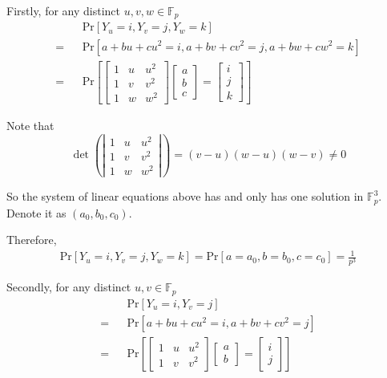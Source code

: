 		\item
		
			Firstly, for any distinct $u, v, w \in \mathbb{F}_{p}$
			\begin{eqnarray*}
				&&\text{Pr}[Y_u = i, Y_v = j, Y_w = k] \\
				= &&\text{Pr}[a + bu + cu^2 = i, a + bv + cv^2 = j, a + bw + cw^2 = k] \\
				= &&\text{Pr}[
				\left[
				\begin{matrix}
					1 & u & u^2 \\
					1 & v & v^2 \\
					1 & w & w^2
				\end{matrix}
				\right]
				\left[
				\begin{matrix}
					a \\
					b \\
					c
				\end{matrix}
				\right]
				=
				\left[
				\begin{matrix}
					i \\
					j \\
					k
				\end{matrix}
				\right]
				]
			\end{eqnarray*}
			
			Note that
			\[
				\det
				\left(\left|
				\begin{matrix}
					1 & u & u^2 \\
					1 & v & v^2 \\
					1 & w & w^2
				\end{matrix}
				\right|\right)
				=
				(v - u)(w - u)(w - v)
				\neq
				0
			\]
			
			So the system of linear equations above has and only has one solution in $\mathbb{F}^{3}_{p}$.
			Denote it as $(a_0, b_0, c_0)$.
			
			Therefore,
			\begin{eqnarray*}
				\text{Pr}[Y_u = i, Y_v = j, Y_w = k]
				= \text{Pr}[a = a_0, b = b_0, c = c_0]
				= \frac{1}{p^3}
			\end{eqnarray*}
			
			Secondly, for any distinct $u, v \in \mathbb{F}_{p}$
			\begin{eqnarray*}
				&&\text{Pr}[Y_u = i, Y_v = j] \\
				= &&\text{Pr}[a + bu + cu^2 = i, a + bv + cv^2 = j] \\
				= &&\text{Pr}[
				\left[
				\begin{matrix}
					1 & u & u^2 \\
					1 & v & v^2
				\end{matrix}
				\right]
				\left[
				\begin{matrix}
					a \\
					b
				\end{matrix}
				\right]
				=
				\left[
				\begin{matrix}
					i \\
					j
				\end{matrix}
				\right]
				]
			\end{eqnarray*}
			
